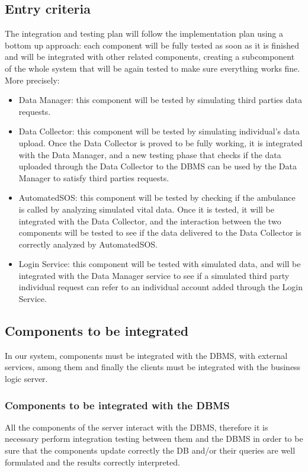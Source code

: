 \subsection{Entry criteria}
The integration and testing plan will follow the implementation plan using a bottom up approach: each component will be fully tested as soon as it is finished and will be integrated with other related components, creating a subcomponent of the whole system that will be again tested to make sure everything works fine.
More precisely:
\begin{itemize}
\item Data Manager: this component will be tested by simulating third parties data requests.
\item Data Collector: this component will be tested by simulating individual's data upload. Once the Data Collector is proved to be fully working, it is integrated with the Data Manager, and a new testing phase that checks if the data uploaded through the Data Collector to the DBMS can be used by the Data Manager to satisfy third parties requests.
\item AutomatedSOS: this component will be tested by checking if the ambulance is called by analyzing simulated vital data. Once it is tested, it will be integrated with the Data Collector, and the interaction between the two components will be tested to see if the data delivered to the Data Collector is correctly analyzed by AutomatedSOS.
\item Login Service: this component will be tested with simulated data, and will be integrated with the Data Manager service to see if a simulated third party individual request can refer to an individual account added through the Login Service.
\end{itemize}



\subsection{Components to be integrated}
In our system, components must be integrated with the DBMS, with external services, among them and finally the clients must be integrated with the business logic server.

\subsubsection{Components to be integrated with the DBMS}
All the components of the server interact with the DBMS, therefore it is necessary perform integration testing between them and the DBMS in order to be sure that the components update correctly the DB and/or their queries are well formulated and the results correctly interpreted.

